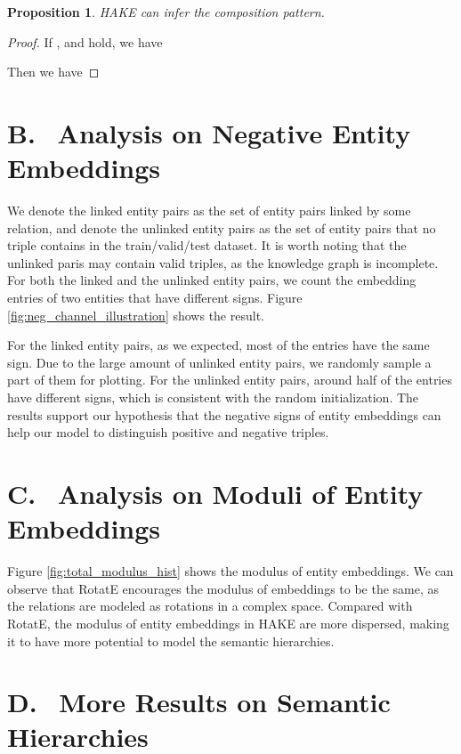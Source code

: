 \documentclass[letterpaper]{article} \usepackage{aaai20}  \usepackage{times}  \usepackage{helvet} \usepackage{courier}  \usepackage[hyphens]{url}  \usepackage{graphicx} \urlstyle{rm} \def\UrlFont{\rm}  \usepackage{graphicx}  \frenchspacing  \setlength{\pdfpagewidth}{8.5in}  \setlength{\pdfpageheight}{11in}
\newtheorem{prop}{Proposition}
\begin{document}
\begin{prop}
    HAKE can infer the composition pattern.
\end{prop}

\begin{proof}
    If ,  and  hold, we have
    
     Then we have
    
    
    
\end{proof}








\section*{B.\,\,\, Analysis on Negative Entity Embeddings}
We denote the linked entity pairs as the set of entity pairs linked by some relation, and denote the unlinked entity pairs as the set of entity pairs that no triple contains in the train/valid/test dataset. It is worth noting that the unlinked paris may contain valid triples, as the knowledge graph is incomplete. For both the linked and the unlinked entity pairs, we count the embedding entries of two entities that have different signs. Figure \ref{fig:neg_channel_illustration} shows the result.

For the linked entity pairs, as we expected, most of the entries have the same sign. Due to the large amount of unlinked entity pairs, we randomly sample a part of them for plotting. For the unlinked entity pairs, around half of the entries have different signs, which is consistent with the random initialization. The results support our hypothesis that the negative signs of entity embeddings can help our model to distinguish positive and negative triples. 

\section*{C.\,\,\, Analysis on Moduli of Entity Embeddings}

Figure \ref{fig:total_modulus_hist} shows the modulus of entity embeddings. We can observe that RotatE encourages the modulus of embeddings to be the same, as the relations are modeled as rotations in a complex space. Compared with RotatE, the modulus of entity embeddings in HAKE are more dispersed, making it to have more potential to model the semantic hierarchies.

\section*{D.\,\,\, More Results on Semantic Hierarchies}
\end{document}
